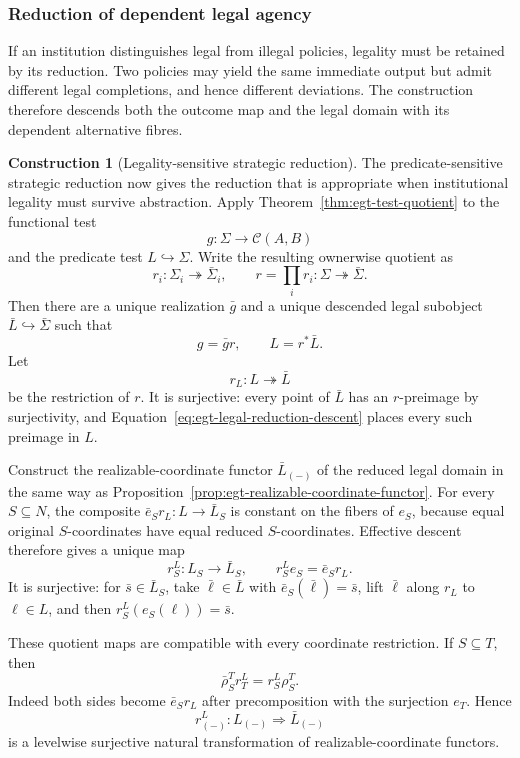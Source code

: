 \documentclass[11pt,a4paper]{article}
\numberwithin{equation}{section}
\theoremstyle{definition}
\newtheorem{construction}[construction]{Construction}
\theoremstyle{remark}
\theoremstyle{plain}
\begin{document}
\subsubsection{Reduction of dependent legal agency}

If an institution distinguishes legal from illegal policies,
legality must be retained by its reduction. Two policies may yield the
same immediate output but admit different legal completions, and hence
different deviations. The construction therefore descends both the
outcome map and the legal domain with its dependent alternative fibres.

\begin{construction}[Legality-sensitive strategic reduction]
The predicate-sensitive strategic reduction now gives the reduction that is
appropriate when institutional legality must survive abstraction. Apply
Theorem~\ref{thm:egt-test-quotient} to the functional test
\[
 g:\Sigma\to\mathcal C(A,B)
\]
and the predicate test $L\hookrightarrow\Sigma$. Write the resulting
ownerwise quotient as
\[
 r_i:\Sigma_i\twoheadrightarrow\bar\Sigma_i,
 \qquad
 r=\prod_i r_i:\Sigma\twoheadrightarrow\bar\Sigma.
\]
Then there are a unique realization $\bar g$ and a unique descended legal
subobject $\bar L\hookrightarrow\bar\Sigma$ such that
\begin{equation}
\label{eq:egt-legal-reduction-descent}
 g=\bar g r,
 \qquad
 L=r^*\bar L.
\end{equation}
Let
\[
 r_L:L\twoheadrightarrow\bar L
\]
be the restriction of $r$. It is surjective: every point of $\bar L$ has an
$r$-preimage by surjectivity, and
Equation~\eqref{eq:egt-legal-reduction-descent} places every such preimage in
$L$.

Construct the realizable-coordinate functor $\bar L_{(-)}$ of the reduced
legal domain in the same way as Proposition~\ref{prop:egt-realizable-coordinate-functor}.
For every $S\subseteq N$, the composite
$\bar e_Sr_L:L\to\bar L_S$ is constant on the fibers of $e_S$, because equal
original $S$-coordinates have equal reduced $S$-coordinates. Effective
descent therefore gives a unique map
\begin{equation}
\label{eq:egt-legal-coordinate-quotient}
 r_S^L:L_S\longrightarrow\bar L_S,
 \qquad
 r_S^Le_S=\bar e_Sr_L.
\end{equation}
It is surjective: for $\bar s\in\bar L_S$, take
$\bar\ell\in\bar L$ with $\bar e_S(\bar\ell)=\bar s$, lift
$\bar\ell$ along $r_L$ to $\ell\in L$, and then
$r_S^L(e_S(\ell))=\bar s$.

These quotient maps are compatible with every coordinate restriction. If
$S\subseteq T$, then
\begin{equation}
\label{eq:egt-legal-coordinate-naturality}
 \bar\rho_S^T r_T^L=r_S^L\rho_S^T.
\end{equation}
Indeed both sides become $\bar e_Sr_L$ after precomposition with the
surjection $e_T$. Hence
\[
 r^L_{(-)}:L_{(-)}\Longrightarrow\bar L_{(-)}
\]
is a levelwise surjective natural transformation of realizable-coordinate
functors.
\end{construction}
\end{document}
